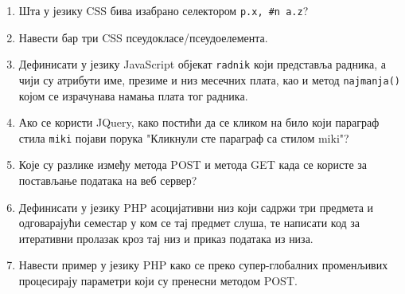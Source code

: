 \documentclass[a4paper]{article}
\begin{document}
\begin{enumerate}
\hrulefill

\hrulefill

\hrulefill

\item Шта у језику CSS бива изабрано селектором \verb|p.x, #n a.z|?

\hrulefill

\hrulefill

\hrulefill

\item Навести бар три CSS псеудокласе/псеудоелемента.

\hrulefill

\hrulefill

\hrulefill

\item Дефинисати у језику JavaScript објекат \verb|radnik| који представља
  радника, а чији су атрибути име, презиме и низ месечних плата, као и метод \verb|najmanja()| којом се 
	израчунава намања плата тог радника.

\hrulefill

\hrulefill

\hrulefill

\item Ако се користи JQuery, како постићи да се кликом на било који параграф стила \verb|miki| појави порука "Кликнули сте параграф са стилом miki"?

\hrulefill

\hrulefill

\hrulefill

\item Које су разлике између метода POST и метода GET када се користе за постављање података на веб сервер?

\hrulefill

\hrulefill

\hrulefill

\item Дефинисати у језику PHP асоцијативни низ који садржи три предмета и
одговарајући семестар у ком се тај предмет слуша, те написати код за
итеративни пролазак кроз тај низ и приказ података из низа.

\hrulefill

\hrulefill

\hrulefill

\item Навести пример у језику PHP како се преко супер-глобалних променљивих процесирају параметри који су пренесни методом POST.


\end{enumerate}
\end{document}

